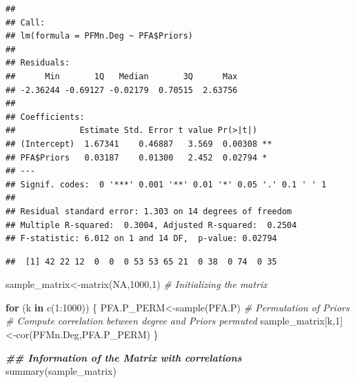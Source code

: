 \documentclass[
  notitlepage,
  onecolumn,
  openany]{book}
\newenvironment{Shaded}{\begin{snugshade}}{\end{snugshade}}
\newcommand{\CommentTok}[1]{\textcolor[rgb]{0.56,0.35,0.01}{\textit{#1}}}
\newcommand{\ConstantTok}[1]{\textcolor[rgb]{0.00,0.00,0.00}{#1}}
\newcommand{\ControlFlowTok}[1]{\textcolor[rgb]{0.13,0.29,0.53}{\textbf{#1}}}
\newcommand{\DecValTok}[1]{\textcolor[rgb]{0.00,0.00,0.81}{#1}}
\newcommand{\DocumentationTok}[1]{\textcolor[rgb]{0.56,0.35,0.01}{\textbf{\textit{#1}}}}
\newcommand{\FunctionTok}[1]{\textcolor[rgb]{0.00,0.00,0.00}{#1}}
\newcommand{\NormalTok}[1]{#1}
\newcommand{\OtherTok}[1]{\textcolor[rgb]{0.56,0.35,0.01}{#1}}
\newcommand{\SpecialCharTok}[1]{\textcolor[rgb]{0.00,0.00,0.00}{#1}}
\begin{document}
\begin{verbatim}
## 
## Call:
## lm(formula = PFMn.Deg ~ PFA$Priors)
## 
## Residuals:
##      Min       1Q   Median       3Q      Max 
## -2.36244 -0.69127 -0.02179  0.70515  2.63756 
## 
## Coefficients:
##             Estimate Std. Error t value Pr(>|t|)   
## (Intercept)  1.67341    0.46887   3.569  0.00308 **
## PFA$Priors   0.03187    0.01300   2.452  0.02794 * 
## ---
## Signif. codes:  0 '***' 0.001 '**' 0.01 '*' 0.05 '.' 0.1 ' ' 1
## 
## Residual standard error: 1.303 on 14 degrees of freedom
## Multiple R-squared:  0.3004, Adjusted R-squared:  0.2504 
## F-statistic: 6.012 on 1 and 14 DF,  p-value: 0.02794
\end{verbatim}

\begin{Shaded}
\end{Shaded}

\begin{verbatim}
##  [1] 42 22 12  0  0  0 53 53 65 21  0 38  0 74  0 35
\end{verbatim}

\begin{Shaded}
\begin{Highlighting}[]
\NormalTok{sample\_matrix}\OtherTok{\textless{}{-}}\FunctionTok{matrix}\NormalTok{(}\ConstantTok{NA}\NormalTok{,}\DecValTok{1000}\NormalTok{,}\DecValTok{1}\NormalTok{) }\CommentTok{\# Initializing the matrix}

\ControlFlowTok{for}\NormalTok{ (k }\ControlFlowTok{in} \FunctionTok{c}\NormalTok{(}\DecValTok{1}\SpecialCharTok{:}\DecValTok{1000}\NormalTok{))}
\NormalTok{\{}
\NormalTok{  PFA.P\_PERM}\OtherTok{\textless{}{-}}\FunctionTok{sample}\NormalTok{(PFA.P) }\CommentTok{\# Permutation of Priors}
  \CommentTok{\# Compute correlation between degree and Priors permuted}
\NormalTok{  sample\_matrix[k,}\DecValTok{1}\NormalTok{]}\OtherTok{\textless{}{-}}\FunctionTok{cor}\NormalTok{(PFMn.Deg,PFA.P\_PERM) }
\NormalTok{\}}

\DocumentationTok{\#\# Information of the Matrix with correlations}
\FunctionTok{summary}\NormalTok{(sample\_matrix)}
\end{Highlighting}
\end{Shaded}
\end{document}
